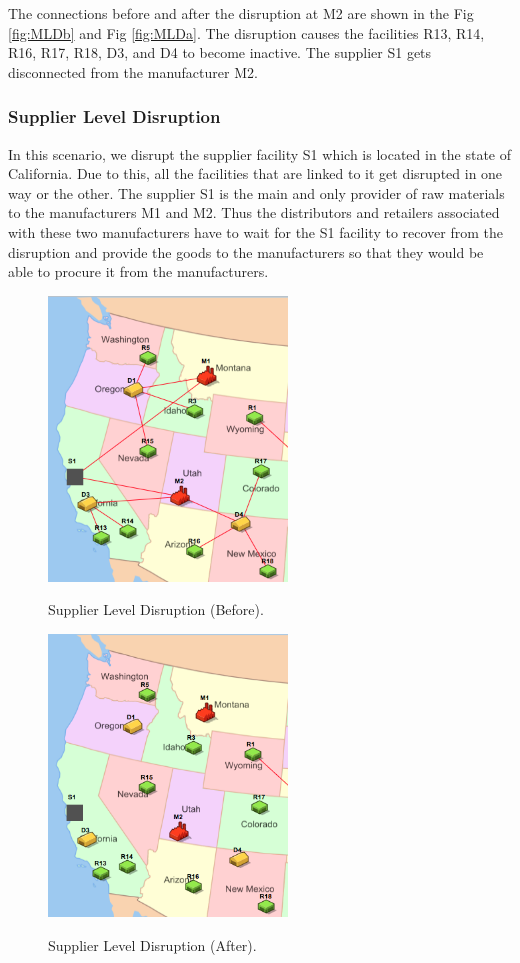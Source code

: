 The connections before and after the disruption at M2 are shown in the Fig \ref{fig:MLDb} and Fig \ref{fig:MLDa}. The disruption causes the facilities R13, R14, R16, R17, R18, D3, and D4 to become inactive. The supplier S1 gets disconnected from the manufacturer M2.

\subsubsection{Supplier Level Disruption}

In this scenario, we disrupt the supplier facility S1 which is located in the state of California. Due to this, all the facilities that are linked to it get disrupted in one way or the other. The supplier S1 is the main and only provider of raw materials to the manufacturers M1 and M2. Thus the distributors and retailers associated with these two manufacturers have to wait for the S1 facility to recover from the disruption and provide the goods to the manufacturers so that they would be able to procure it from the manufacturers. 

\begin{figure}[H]
  \centering
  \includegraphics[width=2.5in]{figures/pdf/BeforeS.png}\\
  \caption{Supplier Level Disruption (Before).}\label{SLDB}
\end{figure}

\begin{figure}[H]
  \centering
  \includegraphics[width=2.5in]{figures/pdf/AfterS.png}\\
  \caption{Supplier Level Disruption (After).}\label{SLDA}
\end{figure}

